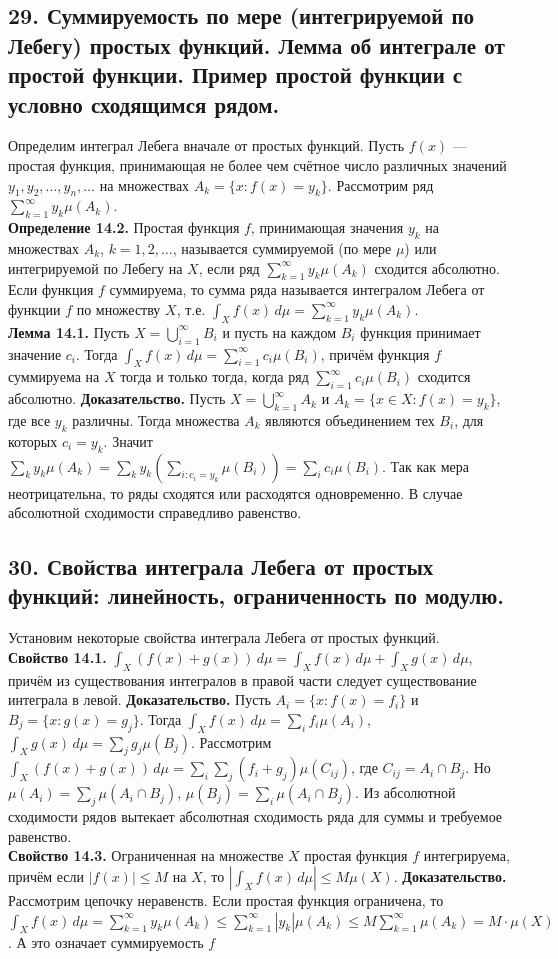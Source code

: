 \documentclass[12pt]{article}
\begin{document}
\subsection*{29. Суммируемость по мере (интегрируемой по Лебегу) простых функций. Лемма об
интеграле от простой функции. Пример простой функции с условно сходящимся рядом.}
Определим интеграл Лебега вначале от простых функций. Пусть $f(x)$ — простая функция, принимающая не более чем счётное число различных значений $y_1,y_2,\dots,y_n,\dots$ на множествах $A_k=\{x:f(x)=y_k\}$. Рассмотрим ряд $\sum_{k=1}^\infty y_k\mu(A_k)$. \\\textbf{Определение 14.2.} Простая функция $f$, принимающая значения $y_k$ на множествах $A_k$, $k=1,2,\dots$, называется суммируемой (по мере $\mu$) или интегрируемой по Лебегу на $X$, если ряд $\sum_{k=1}^\infty y_k\mu(A_k)$ сходится абсолютно. Если функция $f$ суммируема, то сумма ряда называется интегралом Лебега от функции $f$ по множеству $X$, т.е. $\int_X f(x)\,d\mu=\sum_{k=1}^\infty y_k\mu(A_k)$. \\\textbf{Лемма 14.1.} Пусть $X=\bigcup_{i=1}^\infty B_i$ и пусть на каждом $B_i$ функция принимает значение $c_i$. Тогда $\int_X f(x)\,d\mu=\sum_{i=1}^\infty c_i\mu(B_i)$, причём функция $f$ суммируема на $X$ тогда и только тогда, когда ряд $\sum_{i=1}^\infty c_i\mu(B_i)$ сходится абсолютно. \textbf{Доказательство.} Пусть $X=\bigcup_{k=1}^\infty A_k$ и $A_k=\{x\in X:f(x)=y_k\}$, где все $y_k$ различны. Тогда множества $A_k$ являются объединением тех $B_i$, для которых $c_i=y_k$. Значит $\sum_k y_k\mu(A_k)=\sum_k y_k\left(\sum_{i:c_i=y_k}\mu(B_i)\right)=\sum_i c_i\mu(B_i)$. Так как мера неотрицательна, то ряды сходятся или расходятся одновременно. В случае абсолютной сходимости справедливо равенство.

\subsection*{30. Свойства интеграла Лебега от простых функций: линейность, ограниченность по
модулю.}
Установим некоторые свойства интеграла Лебега от простых функций. \\\textbf{Свойство 14.1.} $\int_X (f(x)+g(x))\,d\mu=\int_X f(x)\,d\mu+\int_X g(x)\,d\mu$, причём из существования интегралов в правой части следует существование интеграла в левой. \textbf{Доказательство.} Пусть $A_i=\{x:f(x)=f_i\}$ и $B_j=\{x:g(x)=g_j\}$. Тогда $\int_X f(x)\,d\mu=\sum_i f_i\mu(A_i)$, $\int_X g(x)\,d\mu=\sum_j g_j\mu(B_j)$. Рассмотрим $\int_X(f(x)+g(x))\,d\mu=\sum_i\sum_j(f_i+g_j)\mu(C_{ij})$, где $C_{ij}=A_i\cap B_j$. Но $\mu(A_i)=\sum_j\mu(A_i\cap B_j)$, $\mu(B_j)=\sum_i\mu(A_i\cap B_j)$. Из абсолютной сходимости рядов вытекает абсолютная сходимость ряда для суммы и требуемое равенство. \\\textbf{Свойство 14.3.} Ограниченная на множестве $X$ простая функция $f$ интегрируема, причём если $|f(x)|\leq M$ на $X$, то $\left|\int_X f(x)\,d\mu\right|\leq M\mu(X)$. \textbf{Доказательство.} Рассмотрим цепочку неравенств. Если простая функция ограничена, то $\int_X f(x)\,d\mu=\sum_{k=1}^\infty y_k\mu(A_k)\leq\sum_{k=1}^\infty |y_k|\mu(A_k)\leq M\sum_{k=1}^\infty \mu(A_k)=M\cdot\mu(X)$. А это означает суммируемость $f$
\end{document}
